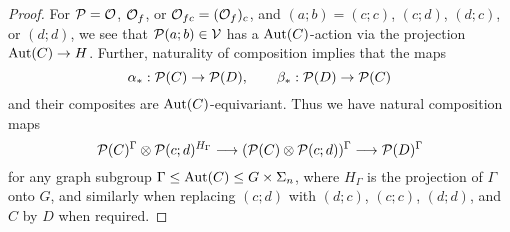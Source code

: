\documentclass[a4paper,10pt
,draft
]{article}%
\renewcommand{\1}{\eta}%
\begin{document}
\begin{proof}
      For $\P = \O$, $\O_f$, or $\O_{f c} = (\O_f)_c$,
      and $(a;b) = (c;c)$, $(c;d)$, $(d;c)$, or $(d;d)$,
      we see that $\P(a;b) \in \V$ has a $\Aut(C)$-action
      via the projection $\Aut(C) \to H$.
      Further, naturality of composition implies that the maps
      \begin{equation}
            \alpha_{\**}: \P(C) \to \P(D),
            \qquad
            \beta_{\**}: \P(D) \to \P(C)
      \end{equation}
      and their composites are $\Aut(C)$-equivariant.
      Thus we have natural composition maps
      \begin{equation}
            \P(C)^\Gamma \otimes \P(c;d)^{H_\Gamma} \longrightarrow
            (\P(C) \otimes \P(c;d))^\Gamma \longrightarrow
            \P(D)^\Gamma
      \end{equation}
      for any graph subgroup $\Gamma \leq \Aut(C) \leq G \times \Sigma_n$,
      where $H_\Gamma$ is the projection of $\Gamma$ onto $G$,
      and similarly when replacing $(c;d)$ with $(d;c)$, $(c;c)$, $(d;d)$,
      and $C$ by $D$ when required.
      

\end{proof}
\end{document}
